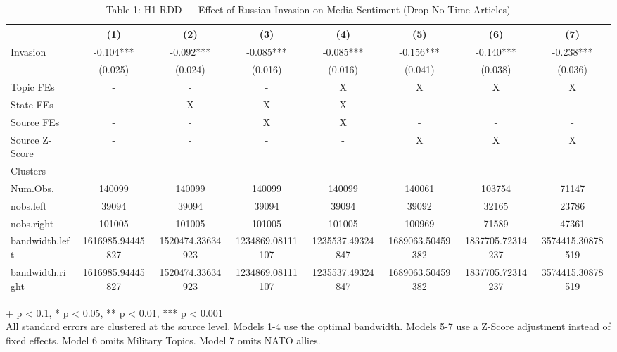 \begin{table}[t]
\caption{\label{tab:table-01}Table 1: H1 RDD — Effect of Russian Invasion on Media Sentiment (Drop No-Time Articles)} 
\fontsize{12.0pt}{14.0pt}\selectfont
\begin{tabular*}{\linewidth}{@{\extracolsep{\fill}}lccccccc}
\toprule
  & (1) & (2) & (3) & (4) & (5) & (6) & (7) \\ 
\midrule\addlinespace[2.5pt]
Invasion & -0.104*** & -0.092*** & -0.085*** & -0.085*** & -0.156*** & -0.140*** & -0.238*** \\ 
{} & {(0.025)} & {(0.024)} & {(0.016)} & {(0.016)} & {(0.041)} & {(0.038)} & {(0.036)} \\ 
Topic FEs & - & - & - & X & X & X & X \\ 
State FEs & - & X & X & X & - & - & - \\ 
Source FEs & - & - & X & X & - & - & - \\ 
Source Z-Score & - & - & - & - & X & X & X \\ 
Clusters & — & — & — & — & — & — & — \\ 
Num.Obs. & 140099 & 140099 & 140099 & 140099 & 140061 & 103754 & 71147 \\ 
nobs.left & 39094 & 39094 & 39094 & 39094 & 39092 & 32165 & 23786 \\ 
nobs.right & 101005 & 101005 & 101005 & 101005 & 100969 & 71589 & 47361 \\ 
bandwidth.left & 1616985.94445827 & 1520474.33634923 & 1234869.08111107 & 1235537.49324847 & 1689063.50459382 & 1837705.72314237 & 3574415.30878519 \\ 
bandwidth.right & 1616985.94445827 & 1520474.33634923 & 1234869.08111107 & 1235537.49324847 & 1689063.50459382 & 1837705.72314237 & 3574415.30878519 \\ 
\bottomrule
\end{tabular*}
\begin{minipage}{\linewidth}
\vspace{.05em}
+ p < 0.1, * p < 0.05, ** p < 0.01, *** p < 0.001\\
All standard errors are clustered at the source level. Models 1-4 use the
optimal bandwidth. Models 5-7 use a Z-Score adjustment instead of fixed effects.
Model 6 omits Military Topics. Model 7 omits NATO allies.\\
\end{minipage}
\end{table}

